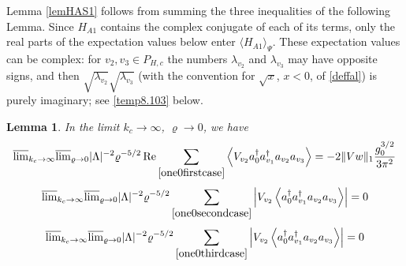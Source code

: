 \documentclass[11pt]{article}
\numberwithin{equation}{section}
\newcommand{\beq}{\begin{equation}}
\newcommand{\eeq}{\end{equation}}
\renewcommand\rho\varrho
\newtheorem{lem}{Lemma}[section]
\theoremstyle{definition}
\begin{document}
Lemma \ref{lemHAS1} follows from summing the three inequalities of the following Lemma. 
Since $H_{A1}$ contains the complex conjugate of each of its terms, only the real parts of the expectation values below enter $\langle H_{A1}\rangle_\Psi$. These expectation values can be complex: for $v_2,v_3\in P_{H,c}$ the numbers $\lambda_{v_2}$ and $\lambda_{v_3}$ may have opposite signs, and then $\sqrt{\lambda_{v_2}}\sqrt{\lambda_{v_3}}$ (with the convention for $\sqrt{x}$, $x<0$, of \eqref{deffal}) is purely imaginary; see \eqref{temp8.103} below.
 \begin{lem}
In the limit $k_c\to \infty$, $\rho\to 0$, we have 
 \beq\label{0resultfirstcase}
	\overline\lim_{k_c\to\infty}\overline\lim_{\rho\to0}  |\Lambda|^{-2} \rho^{-5/2}\, {\rm Re}  \sum_{\eqref{one0firstcase}}\left\langle  V_{v_2}a^\dagger_0a^\dagger_{v_1}a_{v_2}a_{v_3}\right\rangle
	= - 2 \|Vw\|_1\frac{g_0^{3/2}}{3\pi^2}
	\eeq
	\beq\label{0resultsecondcase}
	\overline\lim_{k_c\to\infty}\overline\lim_{\rho\to0} |\Lambda|^{-2} \rho^{-5/2} \sum_{\eqref{one0secondcase}}\left|  V_{v_2} \left\langle a^\dagger_0a^\dagger_{v_1}a_{v_2}a_{v_3}\right\rangle\right|=0
	\eeq
	\beq\label{0resultthirdcase}
	\overline\lim_{k_c\to\infty}\overline\lim_{\rho\to0}|\Lambda|^{-2}\rho^{-5/2} \sum_{\eqref{one0thirdcase}}\left|  V_{v_2} \left  \langle a^\dagger_0a^\dagger_{v_1}a_{v_2}a_{v_3}\right\rangle\right|=0
\eeq
 \end{lem}
\end{document}
